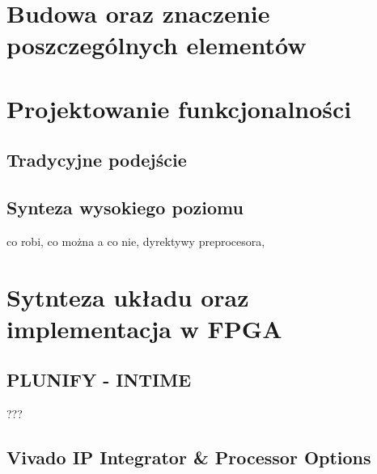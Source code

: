 \section{Budowa oraz znaczenie poszczególnych elementów}

\section{Projektowanie funkcjonalności}
\subsection{Tradycyjne podejście}
\subsection{Synteza wysokiego poziomu}
co robi, co można a co nie, dyrektywy preprocesora,

\section{Sytnteza układu oraz implementacja w FPGA}
\subsection{PLUNIFY - INTIME}
???
\subsection{Vivado IP Integrator \& Processor Options}

